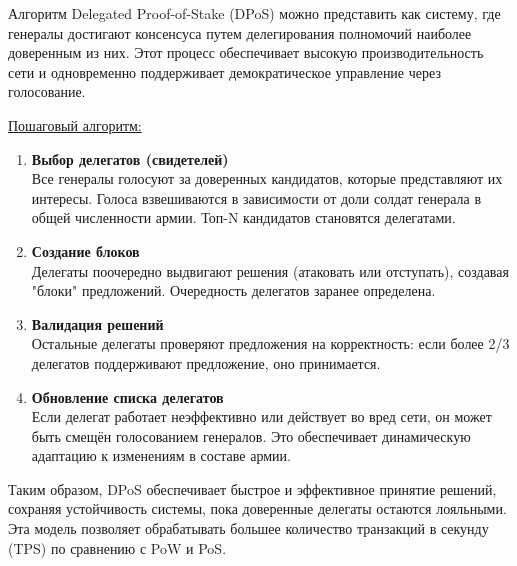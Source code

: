 \hspace{1.25cm}
Алгоритм Delegated Proof-of-Stake (DPoS) можно представить как систему, где генералы достигают консенсуса путем делегирования полномочий наиболее доверенным из них. Этот процесс обеспечивает высокую производительность сети и одновременно поддерживает демократическое управление через голосование.

\underline{Пошаговый алгоритм:}

\begin{enumerate}

	\item \textbf{Выбор делегатов (свидетелей)}\\
Все генералы голосуют за доверенных кандидатов, которые представляют их интересы. Голоса взвешиваются в зависимости от доли солдат генерала в общей численности армии. Топ-N кандидатов становятся делегатами.

	\item \textbf{Создание блоков}\\
Делегаты поочередно выдвигают решения (атаковать или отступать), создавая "блоки" предложений. Очередность делегатов заранее определена.

	\item \textbf{Валидация решений}\\
Остальные делегаты проверяют предложения на корректность: если более 2/3 делегатов поддерживают предложение, оно принимается.

	\item \textbf{Обновление списка делегатов}\\
Если делегат работает неэффективно или действует во вред сети, он может быть смещён голосованием генералов. Это обеспечивает динамическую адаптацию к изменениям в составе армии.

\end{enumerate}

Таким образом, DPoS обеспечивает быстрое и эффективное принятие решений, сохраняя устойчивость системы, пока доверенные делегаты остаются лояльными. Эта модель позволяет обрабатывать большее количество транзакций в секунду (TPS) по сравнению с PoW и PoS.~\cite{binance_DPoS}

\newpage